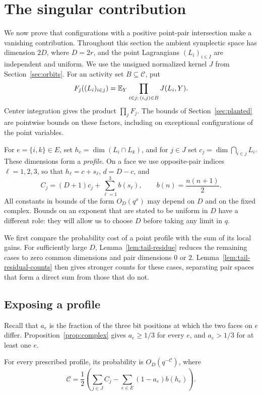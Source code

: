 \section{The singular contribution}\label{sec:tail}

We now prove that configurations with a positive point-pair intersection
make a vanishing contribution.  Throughout this section the ambient
symplectic space has dimension $2D$, where $D=2r$, and the point
Lagrangians $(L_i)_{i\in I}$ are independent and uniform.  We use the
unsigned normalized kernel $J$ from Section~\ref{sec:orbits}.  For an
activity set $B\subseteq\mathscr C$, put
\[
 F_j((L_i)_{i\in j})=
 \mathbb E_Y\prod_{i\in j:\,(i,j)\in B}J(L_i,Y).
\]
Center integration gives the product $\prod_jF_j$.  The bounds of
Section~\ref{sec:planted} are pointwise bounds on these factors, including
on exceptional configurations of the point variables.

For $e=\{i,k\}\in E$, set $h_e=\dim(L_i\cap L_k)$, and for $j\in J$ set
$c_j=\dim\bigcap_{i\in j}L_i$.  These dimensions form a \emph{profile}.
On a face we use opposite-pair indices $\ell=1,2,3$, so that
$h_\ell=c+s_\ell$, $d=D-c$, and
\[
 C_j=(D+1)c_j+\sum_{\ell=1}^3b(s_\ell),
 \qquad b(n)=\frac{n(n+1)}2.
\]
All constants in bounds of the form $O_D(q^x)$ may depend on $D$ and on
the fixed complex.  Bounds on an exponent that are stated to be uniform
in $D$ have a different role: they will allow us to choose $D$ before
taking any limit in $q$.

We first compare the probability cost of a point profile with the sum
of its local gains.  For sufficiently large $D$,
Lemma~\ref{lem:tail-residue} reduces the remaining cases to zero common
dimensions and pair dimensions $0$ or $2$.
Lemma~\ref{lem:tail-residual-counts} then gives stronger counts for these
cases, separating pair spaces that form a direct sum from those that do not.

\subsection{Exposing a profile}

Recall that $a_e$ is the fraction of the three bit positions at which the
two faces on $e$ differ.  Proposition~\ref{prop:complex} gives
$a_e\ge 1/3$ for every $e$, and $a_e>1/3$ for at least one $e$.

\begin{proposition}\label{prop:global-cost}
For every prescribed profile, its probability is $O_D(q^{-\mathcal C})$,
where
\begin{equation}\label{eq:global-cost}
 \mathcal C=\frac12\left(
 \sum_{j\in J}C_j-\sum_{e\in E}(1-a_e)b(h_e)\right).
\end{equation}
\end{proposition}


